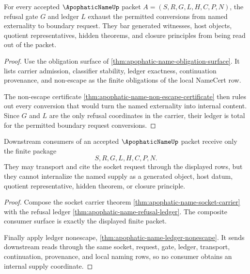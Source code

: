 \begin{theorem}
\label{thm:apophatic-name-refusal-gate-ledger-totality}
For every accepted $\ApophaticNameUp$ packet $A=(S,R,G,L,H,C,P,N)$, the refusal gate $G$ and ledger $L$ exhaust the permitted conversions from named externality to boundary request. They bar generated witnesses, host objects, quotient representatives, hidden theorems, and closure principles from being read out of the packet.
\end{theorem}
\begin{proof}
Use the obligation surface of \autoref{thm:apophatic-name-obligation-surface}. It lists carrier admission, classifier stability, ledger exactness, continuation provenance, and non-escape as the finite obligations of the local NameCert row.

The non-escape certificate \autoref{thm:apophatic-name-non-escape-certificate} then rules out every conversion that would turn the named externality into internal content. Since $G$ and $L$ are the only refusal coordinates in the carrier, their ledger is total for the permitted boundary request conversions.
\end{proof}

\begin{theorem}
\label{thm:apophatic-name-downstream-noninternalization-package}
Downstream consumers of an accepted $\ApophaticNameUp$ packet receive only the finite package
$$
S,R,G,L,H,C,P,N.
$$
They may transport and cite the socket request through the displayed rows, but they cannot internalize the named supply as a generated object, host datum, quotient representative, hidden theorem, or closure principle.
\end{theorem}
\begin{proof}
Compose the socket carrier theorem \autoref{thm:apophatic-name-socket-carrier} with the refusal ledger \autoref{thm:apophatic-name-refusal-ledger}. The composite consumer surface is exactly the displayed finite packet.

Finally apply ledger nonescape, \autoref{thm:apophatic-name-ledger-nonescape}. It sends downstream reads through the same socket, request, gate, ledger, transport, continuation, provenance, and local naming rows, so no consumer obtains an internal supply coordinate.
\end{proof}


